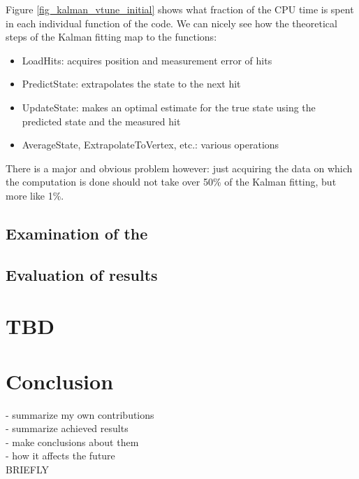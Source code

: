 \documentclass[12pt]{article}
\begin{document}
	Figure \ref{fig_kalman_vtune_initial} shows what fraction of the CPU time is spent in each individual function of the code. We can nicely see how the theoretical steps of the Kalman fitting map to the functions:
	\begin{itemize}
		\item LoadHits: acquires position and measurement error of hits
		\item PredictState: extrapolates the state to the next hit
		\item UpdateState: makes an optimal estimate for the true state using the predicted state and the measured hit
		\item AverageState, ExtrapolateToVertex, etc.: various operations
	\end{itemize}
	There is a major and obvious problem however: just acquiring the data on which the computation is done should not take over 50\% of the Kalman fitting, but more like 1\%.	
	
	\subsection{Examination of the }
	
	\subsection{Evaluation of results}
		
	
	\section{TBD}
	
	\section{Conclusion}
	
	\color{red}
	- summarize my own contributions \\
	- summarize achieved results \\
	- make conclusions about them \\
	- how it affects the future \\
	BRIEFLY
	\color{black}
\end{document}
